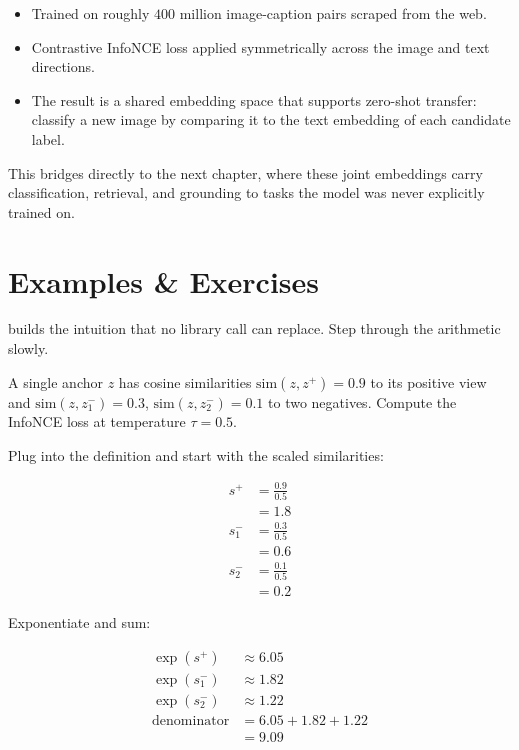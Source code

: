 \begin{itemize}
    \item Trained on roughly $400$ million image-caption pairs scraped from the web.
    \item Contrastive InfoNCE loss applied symmetrically across the image and text directions.
    \item The result is a shared embedding space that supports zero-shot transfer: classify a new image by comparing it to the text embedding of each candidate label.
\end{itemize}

This bridges directly to the next chapter, where these joint embeddings carry classification, retrieval, and grounding to tasks the model was never explicitly trained on.



\newpage
\section{Examples \& Exercises}

 builds the intuition that no library call can replace. Step through the arithmetic slowly.

\vspace{1em}

 A single anchor $z$ has cosine similarities $\text{sim}(z, z^+){=}0.9$ to its positive view and $\text{sim}(z, z^-_1){=}0.3$, $\text{sim}(z, z^-_2){=}0.1$ to two negatives. Compute the InfoNCE loss at temperature $\tau{=}0.5$.

Plug into the definition and start with the scaled similarities:

\begin{align*}
    s^+ &= \tfrac{0.9}{0.5} \\
        &= 1.8 \\
    s^-_1 &= \tfrac{0.3}{0.5} \\
        &= 0.6 \\
    s^-_2 &= \tfrac{0.1}{0.5} \\
        &= 0.2
\end{align*}

Exponentiate and sum:

\begin{align*}
    \exp(s^+) &\approx 6.05 \\
    \exp(s^-_1) &\approx 1.82 \\
    \exp(s^-_2) &\approx 1.22 \\[4pt]
    \text{denominator} &= 6.05 + 1.82 + 1.22 \\
                       &= 9.09
\end{align*}

